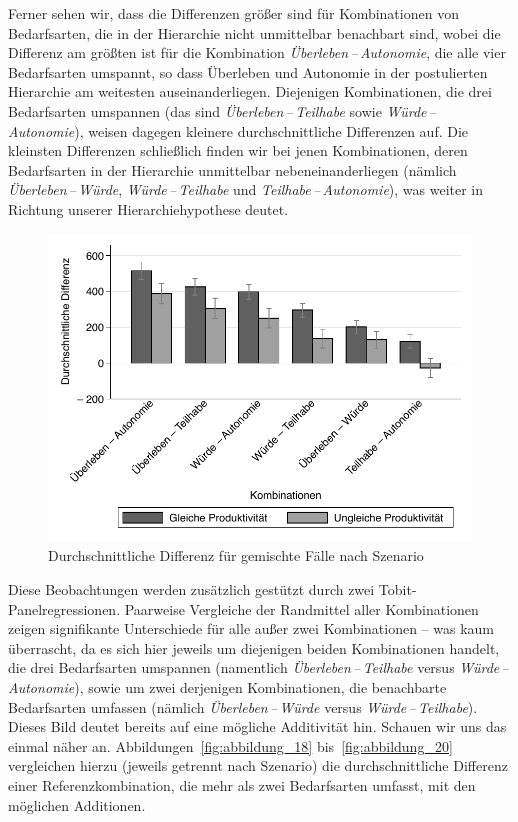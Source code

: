 \documentclass[justified,nobib,symmetric,twoside]{tufte-handout}
\begin{document}
Ferner sehen wir, dass die Differenzen größer sind für Kombinationen von Bedarfsarten, die in der Hierarchie nicht unmittelbar benachbart sind, wobei die Differenz am größten ist für die Kombination \textit{Überleben\,--\,Autonomie}, die alle vier Bedarfsarten umspannt, so dass Überleben und Autonomie in der postulierten Hierarchie am weitesten auseinanderliegen.
Diejenigen Kombinationen, die drei Bedarfsarten umspannen (das sind \textit{Überleben\,--\,Teilhabe} sowie \textit{Würde\,--\,Autonomie}), weisen dagegen kleinere durchschnittliche Differenzen auf.
Die kleinsten Differenzen schließlich finden wir bei jenen Kombinationen, deren Bedarfsarten in der Hierarchie unmittelbar nebeneinanderliegen (nämlich \textit{Überleben\,--\,Würde}, \textit{Würde\,--\,Teilhabe} und \textit{Teilhabe\,--\,Autonomie}), was weiter in Richtung unserer Hierarchiehypothese deutet.

\begin{figure}[t]\label{fig:abbildung_17}
   \center
   \caption{Durchschnittliche Differenz für gemischte Fälle nach Szenario}
   \includegraphics[width=0.99\linewidth]{figure_17.pdf}
\end{figure}

Diese Beobachtungen werden zusätzlich gestützt durch zwei Tobit-Panelregres\-sionen.
Paarweise Vergleiche der Randmittel aller Kombinationen zeigen signifikante Unterschiede für alle außer zwei Kombinationen -- was kaum überrascht, da es sich hier jeweils um diejenigen beiden Kombinationen handelt, die drei Bedarfsarten umspannen (namentlich \textit{Überleben\,--\,Teilhabe} versus \textit{Würde\,--\,Autonomie}), sowie um zwei derjenigen Kombinationen, die benachbarte Bedarfsarten umfassen (nämlich \textit{Überleben\,--\,Würde} versus \textit{Würde\,--\,Teilhabe}).
Dieses Bild deutet bereits auf eine mögliche Additivität hin.
Schauen wir uns das einmal näher an.
Abbildungen~\ref{fig:abbildung_18} bis~\ref{fig:abbildung_20} vergleichen hierzu (jeweils getrennt nach Szenario) die durchschnittliche Differenz einer Referenzkombination, die mehr als zwei Bedarfsarten umfasst, mit den möglichen Additionen.
\end{document}
